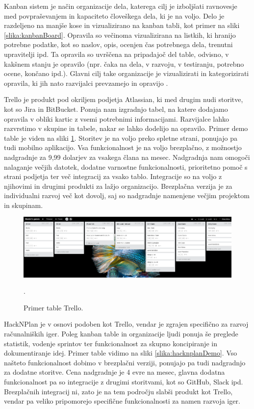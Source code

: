 \documentclass[12pt,a4paper,twoside]{book}
\begin{document}
Kanban sistem je način organizacije dela, katerega cilj je izboljšati ravnovesje med povpraševanjem in kapaciteto človeškega dela, ki je na voljo. Delo je razdeljeno na manjše kose in vizualizirano na kanban tabli, kot primer na sliki \ref{slika:kanbanBoard}. Opravila so večinoma vizualizirana na listkih, ki hranijo potrebne podatke, kot so naslov, opis, ocenjen čas potrebnega dela, trenutni upravitelji ipd. Ta opravila so uvrščena na pripadajoč del table, odvisno, v kakšnem stanju je opravilo (npr. čaka na dela, v razvoju, v testiranju, potrebno ocene, končano ipd.). Glavni cilj take organizacije je vizualizirati in kategorizirati opravila, ki jih nato razvijalci prevzamejo in opravijo \cite{kanbanBoard}.

Trello je produkt pod okriljem podjetja Atlassian, ki med drugim nudi storitve, kot so Jira in BitBucket. Ponuja nam izgradnjo tabel, na katere dodajamo opravila v obliki kartic z vsemi potrebnimi informacijami. Razvijalce lahko razvrstimo v skupine in tabele, nakar se lahko dodelijo na opravilo. Primer demo table je viden na sliki \ref{slika:trelloDemo}. Storitev je na voljo preko spletne strani, ponujajo pa tudi mobilno aplikacijo. Vsa funkcionalnost je na voljo brezplačno, z možnostjo nadgradnje za 9,99 dolarjev za vsakega člana na mesec. Nadgradnja nam omogoči nalaganje večjih datotek, dodatne varnostne funkcionalnosti, prioritetno pomoč s strani podjetja ter več integracij za vsako tablo. Integracije so na voljo z njihovimi in drugimi produkti za lažjo organizacijo. Brezplačna verzija je za individualni razvoj več kot dovolj, saj so nadgradnje namenjene večjim projektom in skupinam.

\begin{figure}[h]
	\centering
	\includegraphics[width=14cm]{trelloBoardDemo}
	\caption{Primer table Trello.}.
	\label{slika:trelloDemo}
	\vspace*{-2em}
\end{figure}

HackNPlan je v osnovi podoben kot Trello, vendar je zgrajen specifično za razvoj računalniških iger. Poleg kanban table in organizacije ljudi ponuja še preglede statistik, vodenje sprintov ter funkcionalnost za skupno koncipiranje in dokumentiranje idej. Primer table vidimo na sliki \ref{slika:hacknplanDemo}. Vso našteto funkcionalnost dobimo v brezplačni verziji, ponujajo pa tudi nadgradnjo za dodatne storitve. Cena nadgradnje je 4 evre na mesec, glavna dodatna funkcionalnost pa so integracije z drugimi storitvami, kot so GitHub, Slack ipd. Brezplačnih integracij ni, zato je na tem področju slabši produkt kot Trello, vendar pa veliko pripomorejo specifične funkcionalnosti za namen razvoja iger.
\end{document}
